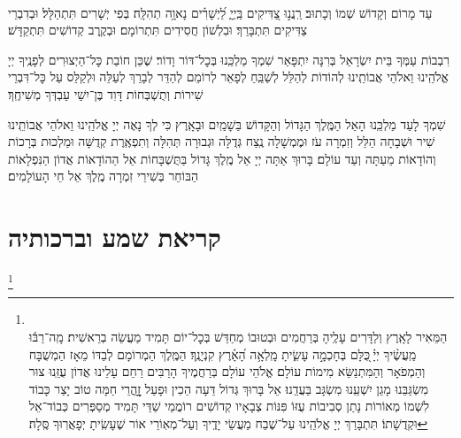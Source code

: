 \documentclass[twoside, openany, parskip=half, 11pt]{book}
\begin{document}
\\
עַד מָרוֹם וְקָדוֹשׁ שְׁמוֹ וְכָתוּב׃ רַֽנֲנ֣וּ צַ֭דִּיקִים בַּֽיְיָ֑ לַ֝יְשָׁרִ֗ים נָאוָ֥ה תְהִלָּֽה׃ בְּפִי יְשָׁרִים תִּתְהַלָּל׃ וּבְדִבְרֵי צַדִּיקִים תִּתְבָּרַךְ׃ וּבִלְשׁוֹן חֲסִידִים תִּתְרוֹמָם׃ וּבְקֶֽרֶב קְדוֹשִׁים תִּתְקַדָּשׁ׃

רִבְבוֹת עַמְּךָ בֵּית יִשְׂרָאֵל בְּרִנָּה יִתְפָּאַר שִׁמְךָ מַלְכֵּֽנוּ בְּכׇל־דּוֹר וָדוֹר׃ שֶׁכֵּן חוֹבַת כׇּל־הַיְצוּרִים לְפָנֶֽיךָ יְיָ אֱלֹהֵֽינוּ וֵאלֹהֵי אֲבוֹתֵֽינוּ לְהוֹדוֹת לְהַלֵּל לְשַׁבֵּֽחַ לְפָאֵר לְרוֹמֵם לְהַדֵּר לְבָרֵךְ לְעַלֵּה וּלְקַלֵּס עַל כׇּל־דִּבְרֵי שִׁירוֹת וְתֻשְׁבְּחוֹת דָּוִד בֶּן־יִשַׁי עַבְדְּךָ מְשִׁיחֶֽךָ׃


שִׁמְךָ לָעַד מַלְכֵּֽנוּ הָאֵל הַמֶּֽלֶךְ הַגָּדוֹל וְהַקָּדוֹשׁ בַּשָׁמַֽיִם וּבָאָֽרֶץ כִּי לְךָ נָאֶה יְיָ אֱלֹהֵֽינוּ וֵאלֹהֵי אֲבוֹתֵֽינוּ שִׁיר וּשְׁבָחָה הַלֵּל וְזִמְרָה עֹז וּמֶמְשָׁלָה נֶֽצַח גְּדֻלָּה וּגְבוּרָה תְּהִלָּה וְתִפְאֶֽרֶת קְדֻשָּׁה וּמַלְכוּת בְּרָכוֹת וְהוֹדָאוֹת מֵעַתָּה וְעַד עוֹלָם׃
בָּרוּךְ אַתָּה יְיָ אֵל מֶֽלֶךְ גָּדוֹל בַּתֻּשְׁבָּחוֹת אֵל הַהוֹדָאוֹת אֲדוֹן הַנִּפְלָאוֹת הַבּוֹחֵר בְּשִׁירֵי זִמְרָה מֶֽלֶךְ אֵל חֵי הָעוֹלָמִים׃
\mimaamakim
\halfkaddish

\section*{ קריאת שמע וברכותיה }

\barachu


\footnote{\\
הַמֵּאִיר לָאָֽרֶץ וְלַדָּרִים עָלֶֽיהָ בְּרַחֲמִים וּבְטוּבוֹ מְחַדֵּשׁ בְּכׇל־יוֹם תָּמִיד מַעֲשֵׂה בְרֵאשִׁית׃
מָֽה־רַבּ֬וּ מַֽעֲשֶׂ֨יךָ יְיָ֗ ֖כֻּלָּם בְּחָכְמָ֣ה עָשִׂ֑יתָ מָֽלְאָ֥ה הָ֝אָ֗רֶץ קִנְיָנֶֽךָ׃ הַמֶּֽלֶךְ הַמְרוֹמָם לְבַדּוֹ מֵאָז הַמְשֻׁבָּח וְהַמְפֹאָר וְהַמִּתְנַשֵּׂא מִימוֹת עוֹלָם׃ אֱלֹהֵי עוֹלָם בְּרַחֲמֶיךָ הָרַבִּים רַחֵם עָלֵינוּ אֲדוֹן עֻזֵּֽנוּ צוּר מִשְׂגַּבֵּנוּ מָגֵן יִשְׁעֵֽנוּ מִשְׂגָּב בַּעֲדֵֽנוּ׃ אֵל בָּרוּךְ גְּדוֹל דֵּעָה הֵכִין וּפָעַל זׇׇׇׇהֳרֵי חַמָּה טוֹב יָצַר כָּבוֹד לִשְׁמוֹ מְאוֹרוֹת נָתַן סְבִיבוֹת עֻזּוֹ פִּנּוֹת צְבָאָיו קְדוֹשִׁים רוֹמֲמֵי שַׁדַּי תָּמִיד מְסַפְּרִים כְּבוֹד־אֵל וּקְדֻשָׁתוֹ׃ תִּתְבָּרַךְ יְיָ אֱלֹהֵֽינוּ עַל־שֶׁבַח מַעֲשֵׂי יָדֶֽיךָ וְעַל־מְאֽוֹרֵי אוֹר שֶׁעָשִֽׂיתָ יְפָאֲרֽוּךָ סֶּֽלָה׃
}
\end{document}
